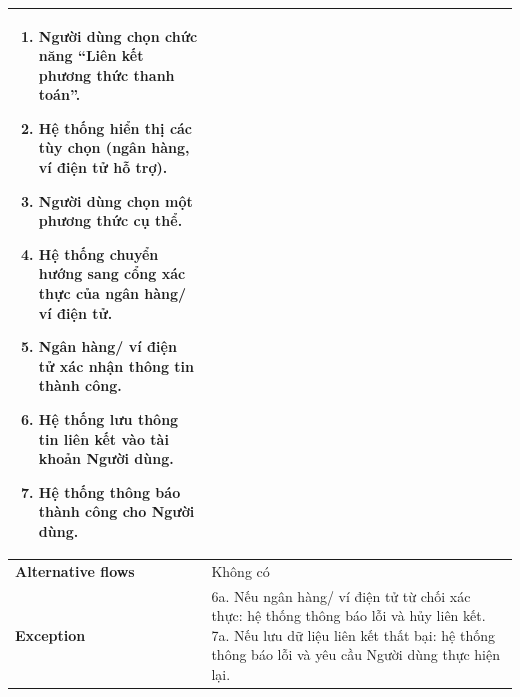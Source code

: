 \begin{itemize}
\begin{longtable}{|m{}|m{}|}
\begin{enumerate}[label=\arabic*.]
    \item Người dùng chọn chức năng “Liên kết phương thức thanh toán”.
    \item Hệ thống hiển thị các tùy chọn (ngân hàng, ví điện tử hỗ trợ).
    \item Người dùng chọn một phương thức cụ thể.
    \item Hệ thống chuyển hướng sang cổng xác thực của ngân hàng/ ví điện tử.
    \item Ngân hàng/ ví điện tử xác nhận thông tin thành công.
    \item Hệ thống lưu thông tin liên kết vào tài khoản Người dùng.
    \item Hệ thống thông báo thành công cho Người dùng.
  \end{enumerate}\\
  \hline
  \textbf{Alternative flows} & Không có\\
  \hline
  \textbf{Exception} &
  6a. Nếu ngân hàng/ ví điện tử từ chối xác thực: hệ thống thông báo lỗi và hủy liên kết. \newline
  7a. Nếu lưu dữ liệu liên kết thất bại: hệ thống thông báo lỗi và yêu cầu Người dùng thực hiện lại.\\
  \hline
  \end{longtable}


\end{itemize}
